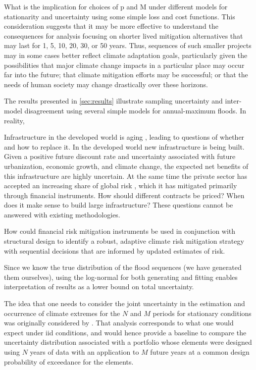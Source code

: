 \documentclass[12pt]{article}
\begin{document}
What is the implication for choices of p and M under different models for stationarity and uncertainty using some simple loss and cost  functions.
This consideration suggests that it may be more effective to understand the consequences for analysis focusing on shorter lived mitigation alternatives that may last for 1, 5, 10, 20, 30, or 50 years.
Thus, sequences of such smaller projects may in some cases better reflect climate adaptation goals, particularly given the possibilities that major climate change impacts in a particular place may occur far into the future; that climate mitigation efforts may be successful; or that the needs of human society may change drastically over these horizons.

The results presented in \cref{sec:results} illustrate sampling uncertainty and inter-model disagreement using several simple models for annual-maximum floods.
In reality, 

Infrastructure in the developed world is aging \citep{Ho2017}, leading to questions of whether and how to replace it.
In the developed world new infrastructure is being built.
Given a positive future discount rate and uncertainty associated with future urbanization, economic growth, and climate change, the expected net benefits of this infrastructure are highly uncertain.
At the same time the private sector has accepted an increasing share of global risk \citep{WorldEconomicForum2016}, which it has mitigated primarily through financial instruments.
How should different contracts be priced? When does it make sense to build large infrastructure?
These questions cannot be answered with existing methodologies.

How could  financial risk mitigation instruments be used in conjunction with structural design to identify a robust, adaptive climate risk mitigation strategy with sequential decisions that are informed by updated estimates of risk.


Since we know the true distribution of the flood sequences (we have generated them ourselves), using the log-normal for both generating and fitting enables interpretation of results as a lower bound on total uncertainty.

The idea that one needs to consider the joint uncertainty in the estimation and occurrence of climate extremes for the $N$ and $M$ periods for stationary conditions was originally considered by \citet{Lall1987}.
That analysis corresponds to what one would expect under \gls{iid} conditions, and would hence provide a baseline to compare the uncertainty distribution associated with a portfolio whose elements were designed using $N$ years of data with an application to $M$ future years at a common design probability of exceedance for the elements. 
\end{document}
